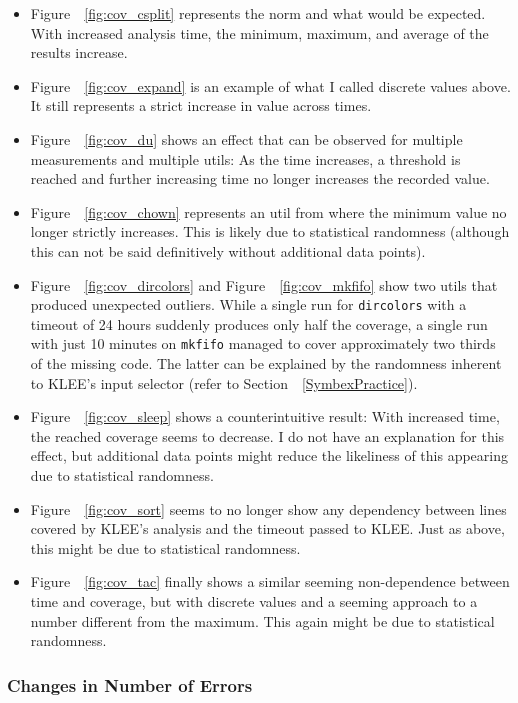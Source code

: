 \documentclass{article}
\let\savedRef=\ref
\renewcommand{\ref}{\unskip~\savedRef}
\begin{document}
\begin{itemize}
    \item Figure~\ref{fig:cov_csplit} represents the norm and what would be expected. With increased analysis time, the minimum, maximum, and average of the results increase.
    \item Figure~\ref{fig:cov_expand} is an example of what I called discrete values above. It still represents a strict increase in value across times.
    \item Figure~\ref{fig:cov_du} shows an effect that can be observed for multiple measurements and multiple utils: As the time increases, a threshold is reached and further increasing time no longer increases the recorded value.
    \item Figure~\ref{fig:cov_chown} represents an util from where the minimum value no longer strictly increases. This is likely due to statistical randomness (although this can not be said definitively without additional data points).
    \item Figure~\ref{fig:cov_dircolors} and Figure~\ref{fig:cov_mkfifo} show two utils that produced unexpected outliers. While a single run for \lstinline{dircolors} with a timeout of 24 hours suddenly produces only half the coverage, a single run with just 10 minutes on \lstinline{mkfifo} managed to cover approximately two thirds of the missing code. The latter can be explained by the randomness inherent to KLEE's input selector (refer to Section~\ref{SymbexPractice}).
    \item Figure~\ref{fig:cov_sleep} shows a counterintuitive result: With increased time, the reached coverage seems to decrease. I do not have an explanation for this effect, but additional data points might reduce the likeliness of this appearing due to statistical randomness.
    \item Figure~\ref{fig:cov_sort} seems to no longer show any dependency between lines covered by KLEE's analysis and the timeout passed to KLEE. Just as above, this might be due to statistical randomness.
    \item Figure~\ref{fig:cov_tac} finally shows a similar seeming non-dependence between time and coverage, but with discrete values and a seeming approach to a number different from the maximum. This again might be due to statistical randomness.
\end{itemize}

\subsubsection{Changes in Number of Errors}
\end{document}
